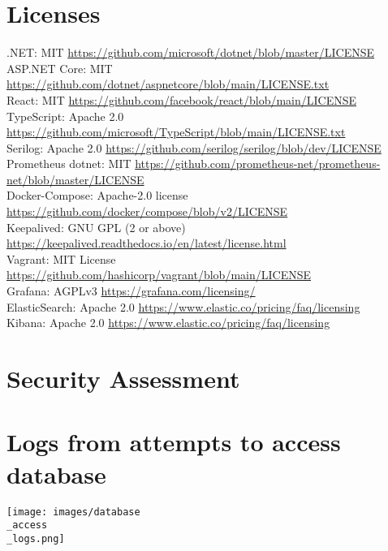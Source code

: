 \appendix
\section{Licenses} \label{ssec:licences}
.NET: MIT \url{https://github.com/microsoft/dotnet/blob/master/LICENSE} \\
ASP.NET Core: MIT \url{https://github.com/dotnet/aspnetcore/blob/main/LICENSE.txt} \\
React: MIT \url{https://github.com/facebook/react/blob/main/LICENSE} \\
TypeScript: Apache 2.0 \url{https://github.com/microsoft/TypeScript/blob/main/LICENSE.txt} \\
Serilog: Apache 2.0 \url{https://github.com/serilog/serilog/blob/dev/LICENSE} \\
Prometheus dotnet: MIT \url{https://github.com/prometheus-net/prometheus-net/blob/master/LICENSE} \\
Docker-Compose: Apache-2.0 license \url{https://github.com/docker/compose/blob/v2/LICENSE} \\
Keepalived: GNU GPL (2 or above) \url{https://keepalived.readthedocs.io/en/latest/license.html} \\
Vagrant: MIT License \url{https://github.com/hashicorp/vagrant/blob/main/LICENSE} \\
Grafana: AGPLv3 \url{https://grafana.com/licensing/} \\
ElasticSearch: Apache 2.0 \url{https://www.elastic.co/pricing/faq/licensing} \\
Kibana: Apache 2.0 \url{https://www.elastic.co/pricing/faq/licensing} \\

\section{Security Assessment}\label{app:SecurityAssessment}


\section{Logs from attempts to access database}
\begin{center}
    \texttt{[image: images/database\\\_access\\\_logs.png]}
\end{center}